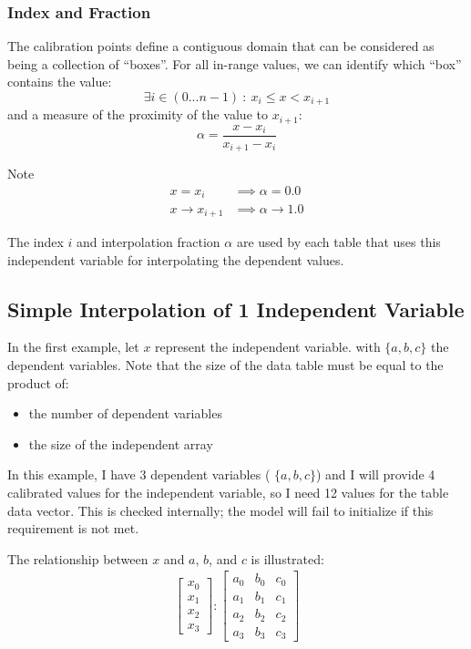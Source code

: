 \documentclass[11pt,fleqn]{report}
\begin{document}
 \subsubsection{Index and Fraction}
 The calibration points define a contiguous domain that can be considered as
 being a collection of ``boxes''. For all in-range values, we can identify which
 ``box'' contains the value:
 \begin{equation*}
    \exists i \in ( 0 ... n - 1 ) ~:~ x_i \leqslant x < x_{i+1}
 \end{equation*}
 and a measure of the proximity of the value to $x_{i+1}$:
 \begin{equation*}
    \alpha = \frac{x - x_i}{x_{i+1} - x_i}
 \end{equation*}

 Note
 \begin{align*}
  x=x_i & \implies \alpha = 0.0 \\
  x \to x_{i+1} & \implies \alpha \to 1.0
 \end{align*}

 The index $i$ and interpolation fraction $\alpha$ are used by each table
 that uses this independent variable for interpolating the dependent values.

\subsection{Simple Interpolation of 1 Independent Variable}
In the first example, let $x$ represent the independent variable.
with $\{a, b, c\}$ the dependent variables.
Note that the size of the data table must be equal to the product of:
\begin{itemize}
 \item the number of dependent variables
 \item the size of the independent array
\end{itemize}
In this example, I have 3 dependent variables ( $\{a, b, c\}$) and I will
provide 4 calibrated values for the independent variable, so I need
12 values for the table data vector.
This is checked internally; the model will fail to initialize if this
requirement is not met.

The relationship between $x$ and $a$, $b$, and $c$ is illustrated:
\begin{align}
 \begin{bmatrix}
  x_0\\x_1\\x_2\\x_3
 \end{bmatrix}
:
\begin{bmatrix}
 a_0&b_0&c_0\\
 a_1&b_1&c_1\\
 a_2&b_2&c_2\\
 a_3&b_3&c_3
\end{bmatrix}
\end{align}
\end{document}
